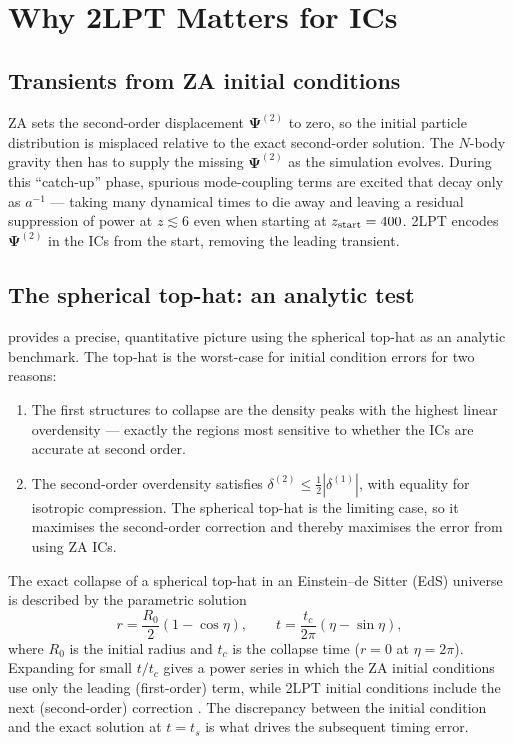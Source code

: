 \documentclass[12pt]{article}
\newcommand{\bPsi}{\boldsymbol{\Psi}}
\begin{document}
\section{Why 2LPT Matters for ICs}
\label{sec:why2lpt}

\subsection{Transients from ZA initial conditions}

ZA sets the second-order displacement $\bPsi^{(2)}$ to zero, so the
initial particle distribution is misplaced relative to the exact
second-order solution.  The $N$-body gravity then has to supply the
missing $\bPsi^{(2)}$ as the simulation evolves.  During this
``catch-up'' phase, spurious mode-coupling terms are excited that
decay only as $a^{-1}$ \citep{Crocce2006} — taking many dynamical
times to die away and leaving a residual suppression of power at
$z \lesssim 6$ even when starting at $z_{\rm start}=400$.
2LPT encodes $\bPsi^{(2)}$ in the ICs from the start, removing the
leading transient.

\subsection{The spherical top-hat: an analytic test}
\label{sec:tophat_timing}

\citet{Jenkins2010} provides a precise, quantitative picture using
the spherical top-hat as an analytic benchmark.
The top-hat is the worst-case for initial condition errors for two
reasons:
%
\begin{enumerate}
  \item The first structures to collapse are the density peaks with
        the highest linear overdensity — exactly the regions most
        sensitive to whether the ICs are accurate at second order.
  \item The second-order overdensity satisfies
        $\delta^{(2)} \le \tfrac{1}{2}|\delta^{(1)}|$,
        with equality for isotropic compression.  The spherical top-hat
        is the limiting case, so it maximises the second-order correction
        and thereby maximises the error from using ZA ICs.
\end{enumerate}

The exact collapse of a spherical top-hat in an Einstein–de Sitter
(EdS) universe is described by the parametric solution
%
\begin{equation}
  r = \frac{R_0}{2}(1-\cos\eta), \qquad
  t = \frac{t_c}{2\pi}(\eta - \sin\eta),
  \label{eq:tophat_param}
\end{equation}
%
where $R_0$ is the initial radius and $t_c$ is the collapse time
($r=0$ at $\eta=2\pi$).
Expanding for small $t/t_c$ gives a power series in which the ZA
initial conditions use only the leading (first-order) term, while
2LPT initial conditions include the next (second-order) correction
\citep{Jenkins2010}.
The discrepancy between the initial condition and the exact solution
at $t=t_s$ is what drives the subsequent timing error.
\end{document}
